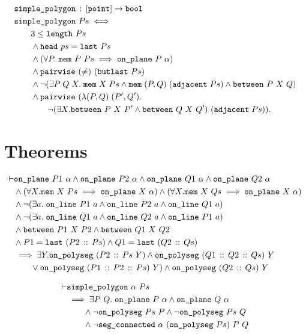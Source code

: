 \begin{align*}
  &\texttt{simple\_polygon}\,:\,[\texttt{point}] \rightarrow \texttt{bool}\\
  &\texttt{simple\_polygon}\ Ps \iff \\
  &\qquad 3 \leq \texttt{length}\ Ps\\
  &\qquad\wedge \texttt{head}\ ps = \texttt{last}\ Ps\\
  &\qquad\wedge (\forall P.\;\texttt{mem}\ P\ Ps \implies \texttt{on\_plane}\ P\ \alpha)\\
  &\qquad\wedge \texttt{pairwise}\ (\neq)\ (\texttt{butlast}\ Ps)\\
  &\qquad\wedge \neg(\exists P\;Q\;X.\; \texttt{mem}\;X\;Ps\wedge\texttt{mem}\;(P,Q)\;(\texttt{adjacent}\;Ps)\wedge\texttt{between}\ P\ X\ Q)\\
  &\qquad\wedge \texttt{pairwise}\ (\lambda(P,Q)\;(P',Q').\\
  &\qquad\qquad\neg(\exists X. \texttt{between}\ P\ X\ P' \wedge \texttt{between}\ Q\ X\ Q')\ (\texttt{adjacent}\;Ps)).
\end{align*}

\section{Theorems}
\begin{align*}
\vdash &\code{on\_plane}\ P1\ \alpha \wedge \code{on\_plane}\ P2\ \alpha \wedge \code{on\_plane}\ Q1\ \alpha \wedge \code{on\_plane}\ Q2\ \alpha\\
       &\wedge(\forall X. \code{mem}\ X\ Ps \implies \code{on\_plane}\ X\ \alpha) \wedge (\forall X. \code{mem}\ X\ Qs \implies \code{on\_plane}\ X\ \alpha)\\
       &\wedge\Triangle{a}{P1}{P2}{Q1}\\
       &\wedge\Triangle{a}{Q1}{Q2}{P1}\\
       &\wedge\code{between}\ P1\ X\ P2 \wedge \code{between}\ Q1\ X\ Q2\\
       &\wedge P1 = \code{last}\ (\cons{P2}{Ps}) \wedge Q1 = \code{last}\ (\cons{Q2}{Qs})\\
       &\implies \exists Y. \code{on\_polyseg}\ (\cons{P2}{Ps}\ Y) \wedge \code{on\_polyseg}\ (\cons{Q1}{\cons{Q2}{Qs}})\ Y\\
       &\qquad\vee \code{on\_polyseg}\ (\cons{P1}{\cons{P2}{Ps}})\ Y) \wedge \code{on\_polyseg}\ (\cons{Q2}{Qs})\ Y
\end{align*}

\begin{align*}
\vdash &\code{simple\_polygon}\ \alpha\ Ps\\
       &\implies \exists P\ Q.\; \code{on\_plane}\ P\ \alpha \wedge \code{on\_plane}\ Q\ \alpha\\
       &\qquad\wedge \neg\code{on\_polyseg}\ Ps\ P \wedge \neg\code{on\_polyseg}\ Ps\ Q\\
       &\qquad\wedge \neg\code{seg\_connected}\ \alpha\ (\code{on\_polyseg}\ Ps)\ P\ Q
\end{align*}

